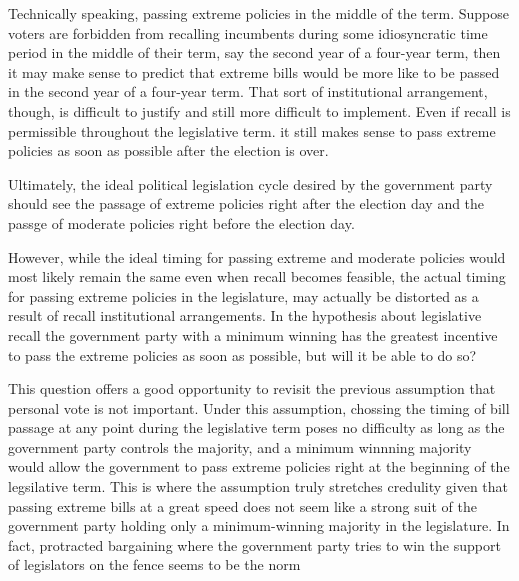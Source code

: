 \documentclass[hyphens, crop=false]{standalone}
\begin{document}
	Technically speaking,
	passing extreme policies in the middle of the term.
	Suppose voters are forbidden from
	recalling incumbents
	during some idiosyncratic time period in the middle of their term,
	say the second year of a four-year term,
	then it may make sense to predict that
	extreme bills would be more like
	to be passed in the second year of a four-year term.
	That sort of institutional arrangement,
	though,
	is difficult to justify and still more difficult to implement.
	Even if recall is permissible throughout the legislative term.
	it still makes sense to pass extreme policies
	as soon as possible after the election is over.
	
	Ultimately,
	the ideal political legislation cycle desired by the government party
	should see the passage of extreme policies
	right after the election day
	and the passge of moderate policies right before the election day.
	
	
	
	
	
	However,
	while the ideal timing for passing extreme and moderate policies
	would most likely remain the same even
	when recall becomes feasible,
	the actual timing for passing extreme policies in the legislature,
	may actually be distorted as a result of recall institutional arrangements.
	In the hypothesis about legislative recall
	the government party with a minimum winning
	has the greatest incentive to pass the extreme policies as soon as possible,
	but will it be able to do so?
	
	This question offers a good opportunity
	to revisit the previous assumption that personal vote is not important.
	Under this assumption,
	chossing the timing of bill passage at any point during the legislative term 
	poses no difficulty as long as the government party controls the majority,
	and a minimum winnning majority would allow the government
	to pass extreme policies right at the beginning of the legsilative term.
	This is where the assumption truly stretches credulity
	given that passing extreme bills at a great speed
	does not seem like a strong suit of the government party
	holding only a minimum-winning majority in the legislature.
	In fact, protracted bargaining where the government party tries
	to win the support of legislators on the fence seems to be the norm
	
\end{document}

